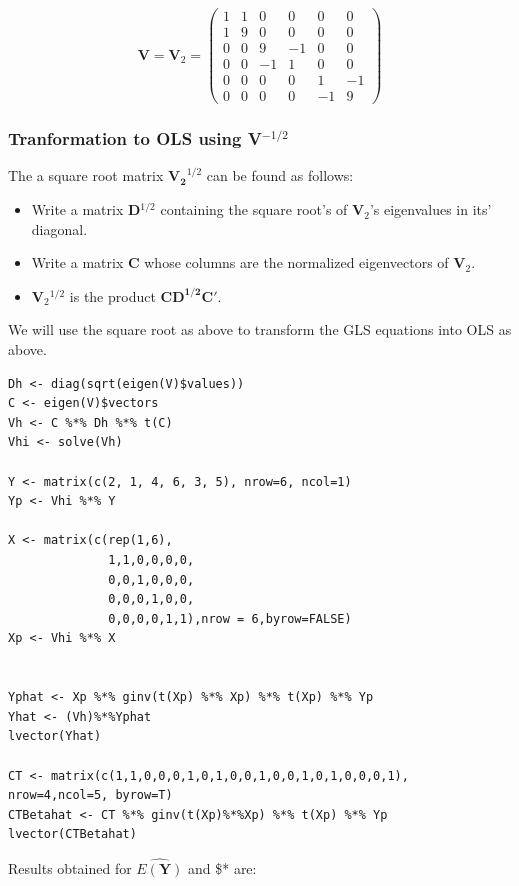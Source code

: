 \documentclass[11pt]{article}
\begin{document}
\[ 
\mathbf{V} = \mathbf{V}_2 = 
\begin{pmatrix}
1 & 1 & 0 & 0 & 0 & 0 \\
1 & 9 & 0 & 0 & 0 & 0 \\
0 & 0 & 9 & -1& 0 & 0 \\
0 & 0 & -1& 1 & 0 & 0 \\
0 & 0 & 0 & 0 & 1 & -1 \\
0 & 0 & 0 & 0 & -1 & 9
\end{pmatrix}
\]
\subsubsection{Tranformation to OLS using \textbf{V$^{\mathrm{-1/2}}$}}
\label{sec-2-2-1}


The a square root matrix $\mathbf{V_2}^{1/2}$ can be found as follows:

\begin{itemize}
\item Write a matrix \textbf{D$^{\mathrm{1/2}}$} containing the square root's of \textbf{V$_2$}'s eigenvalues in its' diagonal.
\item Write a matrix \textbf{C} whose columns are the normalized eigenvectors of \textbf{V$_2$}.
\item \textbf{V$_2$$^{\mathrm{1/2}}$} is the product $\mathbf{CD^{1/2}C'}$.
\end{itemize}

We will use the square root as above to transform the GLS equations
into OLS as above.
     

\begin{verbatim}
Dh <- diag(sqrt(eigen(V)$values))
C <- eigen(V)$vectors 
Vh <- C %*% Dh %*% t(C)
Vhi <- solve(Vh)

Y <- matrix(c(2, 1, 4, 6, 3, 5), nrow=6, ncol=1)
Yp <- Vhi %*% Y

X <- matrix(c(rep(1,6),
              1,1,0,0,0,0,
              0,0,1,0,0,0,
              0,0,0,1,0,0,
              0,0,0,0,1,1),nrow = 6,byrow=FALSE)
Xp <- Vhi %*% X


Yphat <- Xp %*% ginv(t(Xp) %*% Xp) %*% t(Xp) %*% Yp
Yhat <- (Vh)%*%Yphat
lvector(Yhat)

CT <- matrix(c(1,1,0,0,0,1,0,1,0,0,1,0,0,1,0,1,0,0,0,1), nrow=4,ncol=5, byrow=T)
CTBetahat <- CT %*% ginv(t(Xp)%*%Xp) %*% t(Xp) %*% Yp
lvector(CTBetahat)
\end{verbatim}

Results obtained for $\widehat{E(\mathbf{Y})}$ and \$* are:
\end{document}
